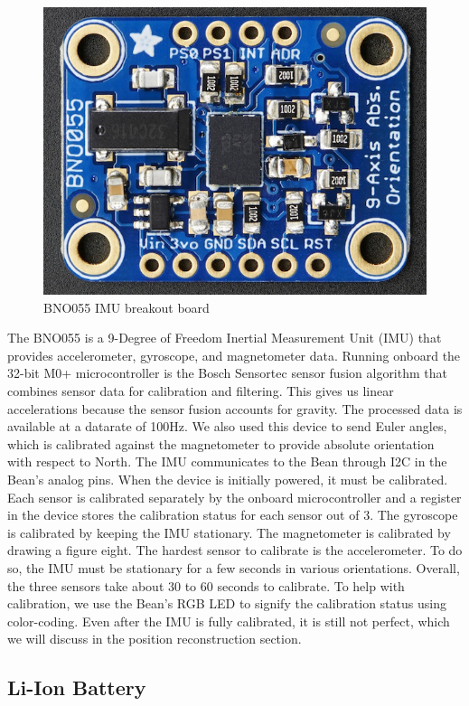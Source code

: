 \documentclass[12pt,journal]{IEEEtran}
\begin{document}
\begin{figure}[H]
  \centering
    \includegraphics[width=0.6\linewidth]{figures/imu}
  \caption{BNO055 IMU breakout board}
  \label{fig:imu}
\end{figure}
  The BNO055 is a 9-Degree of Freedom Inertial Measurement Unit (IMU) that provides accelerometer, gyroscope, and magnetometer data. Running onboard the 32-bit M0+ microcontroller is the Bosch Sensortec sensor fusion algorithm that combines sensor data for calibration and filtering. This gives us linear accelerations because the sensor fusion accounts for gravity. The processed data is available at a datarate of 100Hz. We also used this device to send Euler angles, which is calibrated against the magnetometer to provide absolute orientation with respect to North. The IMU communicates to the Bean through I2C in the Bean’s analog pins.
  When the device is initially powered, it must be calibrated. Each sensor is calibrated separately by the onboard microcontroller and a register in the device stores the calibration status for each sensor out of 3. The gyroscope is calibrated by keeping the IMU stationary. The magnetometer is calibrated by drawing a figure eight. The hardest sensor to calibrate is the accelerometer. To do so, the IMU must be stationary for a few seconds in various orientations. Overall, the three sensors take about 30 to 60 seconds to calibrate. To help with calibration, we use the Bean’s RGB LED to signify the calibration status using color-coding. Even after the IMU is fully calibrated, it is still not perfect, which we will discuss in the position reconstruction section.
\subsection{Li-Ion Battery}
\end{document}
